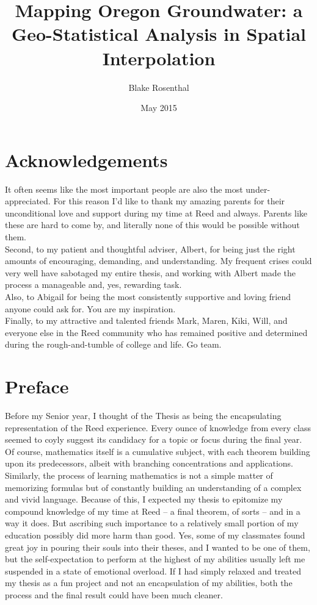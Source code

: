 \documentclass[12pt,twoside]{reedthesis}
\title{Mapping Oregon Groundwater: a Geo-Statistical Analysis in Spatial Interpolation}
\author{Blake Rosenthal}
\date{May 2015}
\begin{document}
  \maketitle
  \frontmatter %
  \pagestyle{empty} %
  
  \onehalfspacing


    \chapter*{Acknowledgements}
	It often seems like the most important people are also the most under-appreciated. For this reason I'd like to thank my amazing parents for their unconditional love and support during my time at Reed and always. Parents like these are hard to come by, and literally none of this would be possible without them.\\
	
	Second, to my patient and thoughtful adviser, Albert, for being just the right amounts of encouraging, demanding, and understanding. My frequent crises could very well have sabotaged my entire thesis, and working with Albert made the process a manageable and, yes, rewarding task. \\
	
	Also, to Abigail for being the most consistently supportive and loving friend anyone could ask for. You are my inspiration. \\
	
	Finally, to my attractive and talented friends Mark, Maren, Kiki, Will, and everyone else in the Reed community who has remained positive and determined during the rough-and-tumble of college and life. Go team.


    \chapter*{Preface}
    
	Before my Senior year, I thought of the Thesis as being the encapsulating representation of the Reed experience. Every ounce of knowledge from every class seemed to coyly suggest its candidacy for a topic or focus during the final year. Of course, mathematics itself is a cumulative subject, with each theorem building upon its predecessors, albeit with branching concentrations and applications. Similarly, the process of learning mathematics is not a simple matter of memorizing formulas but of constantly building an understanding of a complex and vivid language. Because of this, I expected my thesis to epitomize my compound knowledge of my time at Reed -- a final theorem, of sorts -- and in a way it does. But ascribing such importance to a relatively small portion of my education possibly did more harm than good. Yes, some of my classmates found great joy in pouring their souls into their theses, and I wanted to be one of them, but the self-expectation to perform at the highest of my abilities usually left me suspended in a state of emotional overload. If I had simply relaxed and treated my thesis as a fun project and not an encapsulation of my abilities, both the process and the final result could have been much cleaner. \\
	
\end{document}
